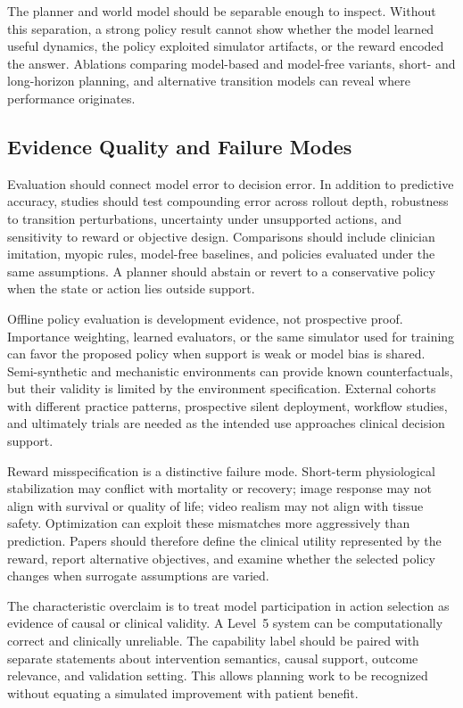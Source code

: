 The planner and world model should be separable enough to inspect. Without this separation, a strong policy result cannot show whether the model learned useful dynamics, the policy exploited simulator artifacts, or the reward encoded the answer. Ablations comparing model-based and model-free variants, short- and long-horizon planning, and alternative transition models can reveal where performance originates.

\subsection{Evidence Quality and Failure Modes}

Evaluation should connect model error to decision error. In addition to predictive accuracy, studies should test compounding error across rollout depth, robustness to transition perturbations, uncertainty under unsupported actions, and sensitivity to reward or objective design. Comparisons should include clinician imitation, myopic rules, model-free baselines, and policies evaluated under the same assumptions. A planner should abstain or revert to a conservative policy when the state or action lies outside support.

Offline policy evaluation is development evidence, not prospective proof. Importance weighting, learned evaluators, or the same simulator used for training can favor the proposed policy when support is weak or model bias is shared. Semi-synthetic and mechanistic environments can provide known counterfactuals, but their validity is limited by the environment specification. External cohorts with different practice patterns, prospective silent deployment, workflow studies, and ultimately trials are needed as the intended use approaches clinical decision support.

Reward misspecification is a distinctive failure mode. Short-term physiological stabilization may conflict with mortality or recovery; image response may not align with survival or quality of life; video realism may not align with tissue safety. Optimization can exploit these mismatches more aggressively than prediction. Papers should therefore define the clinical utility represented by the reward, report alternative objectives, and examine whether the selected policy changes when surrogate assumptions are varied.

The characteristic overclaim is to treat model participation in action selection as evidence of causal or clinical validity. A Level~5 system can be computationally correct and clinically unreliable. The capability label should be paired with separate statements about intervention semantics, causal support, outcome relevance, and validation setting. This allows planning work to be recognized without equating a simulated improvement with patient benefit.

